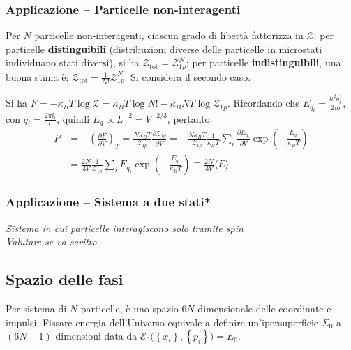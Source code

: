 \documentclass[10pt, a4paper]{scrartcl}
\numberwithin{equation}{subsection}
\theoremstyle{style1}
\theoremstyle{style2}
\newenvironment{boxenv}[1][]{
    \begin{eqbox}[#1]
    }{
   \end{eqbox}
}
\begin{document}
\subsubsection{Applicazione -- Particelle non-interagenti}

Per $N$ particelle non-interagenti, ciascun grado di libert\`a fattorizza in $\mathscr{Z}$; per particelle \textbf{distinguibili} (distribuzioni diverse delle particelle in microstati individuano stati diversi), si ha $\mathscr{Z}_\text{tot} = \mathscr{Z}_{1p} ^N$; per particelle \textbf{indistinguibili}, una buona stima \`e: $\mathscr{Z}_\text{tot} = \frac{1}{N!}\mathscr{Z}_{1p} ^N$. Si considera il secondo caso.

Si ha $F = - \kappa _B T \log \mathscr{Z}= \kappa _B T \log N! - \kappa _B N T \log \mathscr{Z}_{1p} $. Ricordando che $E_{q_i}  = \frac{\hbar ^2 q_{i} ^2}{2m} $, con $q _ i= \frac{2\pi l_i}{L}$, quindi $E_q \propto L^{-2} = V^{-2 / 3} $, pertanto:
\[
\begin{split}
	P &= - \left(\frac{\partial F}{\partial V} \right) _T = \frac{N\kappa _B T}{\mathscr{Z}_{1p} }\frac{\partial \mathscr{Z}_{1p} }{\partial V} = - \frac{N\kappa _B T}{\mathscr{Z}_{1p} }\frac{1}{\kappa _BT} \sum_{i}^{} \frac{\partial E_{q_i} }{\partial V} \exp \left(- \frac{E_{q_i} }{\kappa _B T}\right) \\
	  &= \frac{2N}{3V}\frac{1}{\mathscr{Z}_{1p} } \sum_{i}^{} E_{q_i} \exp \left( - \frac{E_{q_i} }{\kappa _BT}\right) \equiv \frac{2N}{3V} \langle E \rangle
\end{split}
\] 


\subsubsection{Applicazione -- Sistema a due stati*}
\begin{boxenv}[]
\centering \textit{Sistema in cui particelle interagiscono solo tramite spin\\ Valutare se va scritto} 
\end{boxenv}
\subsection{Spazio delle fasi}

Per sistema di $N$ particelle, \`e uno spazio $6N$-dimensionale delle coordinate e impulsi. Fissare energia dell'Universo equivale a definire un'ipersuperficie $\Sigma_0$ a $(6N-1)$ dimensioni data da $\mathscr{E}_0\big(\left\{ x_i \right\} , \left\{ p_i \right\} \big) = E_0$.
\end{document}
